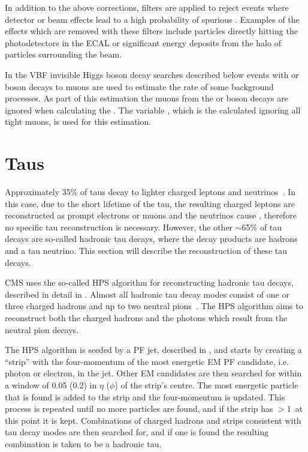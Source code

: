 In addition to the above corrections, filters are applied to reject events where detector or beam effects lead to a high probability of spurious \MET. Examples of the effects which are removed with these filters include particles directly hitting the photodetectors in the \ac{ECAL} or significant energy deposits from the halo of particles surrounding the \LHC beam.

In the \ac{VBF} invisible Higgs boson decay searches described below events with \PW or \PZ boson decays to muons are used to estimate the rate of some background processes. As part of this estimation the muons from the \PW or \PZ boson decays are ignored when calculating the \MET. The variable \METnoMU, which is the \MET calculated ignoring all tight muons, is used for this estimation.
\section{Taus}
\label{sec:taus}
Approximately 35\% of taus decay to lighter charged leptons and neutrinos~\cite{pdg}. In this case, due to the short lifetime of the tau, the resulting charged leptons are reconstructed as prompt electrons or muons and the neutrinos cause \MET, therefore no specific tau reconstruction is necessary. However, the other $\sim$65\% of tau decays are so-called hadronic tau decays, where the decay products are hadrons and a tau neutrino. This section will describe the reconstruction of these tau decays.

CMS uses the so-called \ac{HPS} algorithm for reconstructing hadronic tau decays, described in detail in . Almost all hadronic tau decay modes consist of one or three charged hadrons and up to two neutral pions~\cite{pdg}. The \ac{HPS} algorithm aims to reconstruct both the charged hadrons and the photons which result from the neutral pion decays.

The \ac{HPS} algorithm is seeded by a \ac{PF} jet, described in , and starts by creating a ``strip'' with the four-momentum of the most energetic \ac{EM} \ac{PF} candidate, i.e. photon or electron, in the jet. Other \ac{EM} candidates are then searched for within  a window of 0.05 (0.2) in $\eta$ ($\phi$) of the strip's centre. The most energetic particle that is found is added to the strip and the four-momentum is updated. This process is repeated until no more particles are found, and if the strip has \pt$>1$\GeV\, at this point it is kept. Combinations of charged hadrons and strips consistent with tau decay modes are then searched for, and if one is found the resulting combination is taken to be a hadronic tau.

